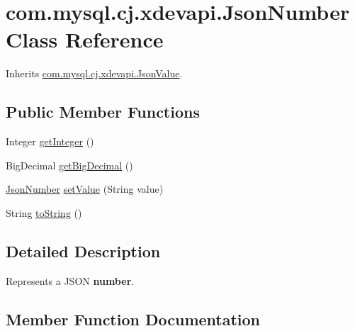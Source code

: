 \hypertarget{classcom_1_1mysql_1_1cj_1_1xdevapi_1_1_json_number}{}\section{com.\+mysql.\+cj.\+xdevapi.\+Json\+Number Class Reference}
\label{classcom_1_1mysql_1_1cj_1_1xdevapi_1_1_json_number}


Inherits \mbox{\hyperlink{interfacecom_1_1mysql_1_1cj_1_1xdevapi_1_1_json_value}{com.\+mysql.\+cj.\+xdevapi.\+Json\+Value}}.

\subsection*{Public Member Functions}
\begin{DoxyCompactItemize}
\item 
Integer \mbox{\hyperlink{classcom_1_1mysql_1_1cj_1_1xdevapi_1_1_json_number_a3e58ec83a320dff5e31a56db7f8daec1}{get\+Integer}} ()
\item 
Big\+Decimal \mbox{\hyperlink{classcom_1_1mysql_1_1cj_1_1xdevapi_1_1_json_number_a325cf86f8fe53619fef22fb48249c5e2}{get\+Big\+Decimal}} ()
\item 
\mbox{\hyperlink{classcom_1_1mysql_1_1cj_1_1xdevapi_1_1_json_number}{Json\+Number}} \mbox{\hyperlink{classcom_1_1mysql_1_1cj_1_1xdevapi_1_1_json_number_ac9c9fcd92d6adf4adb303efe90ef2779}{set\+Value}} (String value)
\item 
String \mbox{\hyperlink{classcom_1_1mysql_1_1cj_1_1xdevapi_1_1_json_number_acb62be6bedfac5f334be939c14d2b84d}{to\+String}} ()
\end{DoxyCompactItemize}


\subsection{Detailed Description}
Represents a J\+S\+ON {\bfseries number}. 

\subsection{Member Function Documentation}
\mbox{\label{classcom_1_1mysql_1_1cj_1_1xdevapi_1_1_json_number_a325cf86f8fe53619fef22fb48249c5e2}} 
